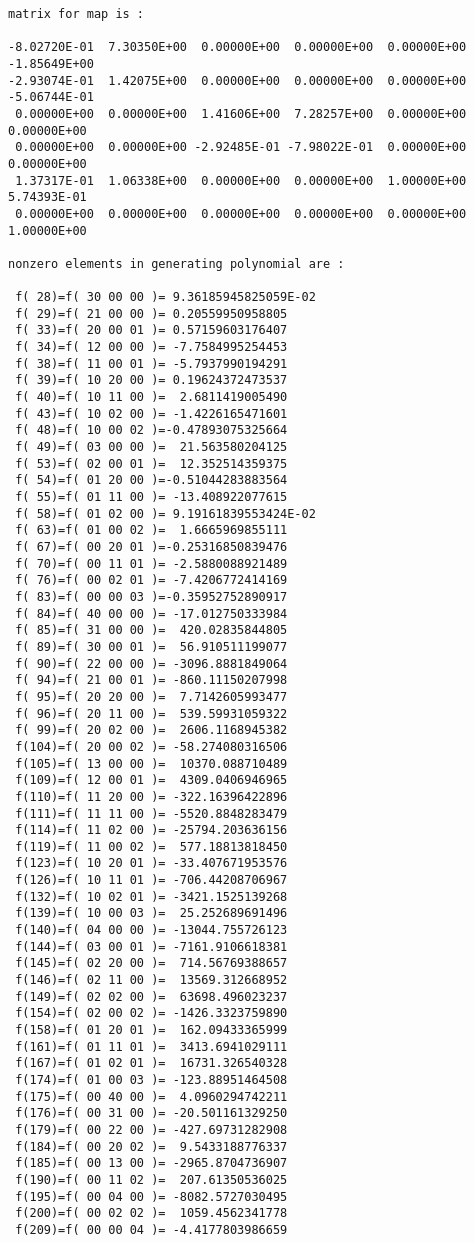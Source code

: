 \begin{footnotesize}
\begin{verbatim}
matrix for map is :

-8.02720E-01  7.30350E+00  0.00000E+00  0.00000E+00  0.00000E+00 -1.85649E+00
-2.93074E-01  1.42075E+00  0.00000E+00  0.00000E+00  0.00000E+00 -5.06744E-01
 0.00000E+00  0.00000E+00  1.41606E+00  7.28257E+00  0.00000E+00  0.00000E+00
 0.00000E+00  0.00000E+00 -2.92485E-01 -7.98022E-01  0.00000E+00  0.00000E+00
 1.37317E-01  1.06338E+00  0.00000E+00  0.00000E+00  1.00000E+00  5.74393E-01
 0.00000E+00  0.00000E+00  0.00000E+00  0.00000E+00  0.00000E+00  1.00000E+00

nonzero elements in generating polynomial are :

 f( 28)=f( 30 00 00 )= 9.36185945825059E-02
 f( 29)=f( 21 00 00 )= 0.20559950958805
 f( 33)=f( 20 00 01 )= 0.57159603176407
 f( 34)=f( 12 00 00 )= -7.7584995254453
 f( 38)=f( 11 00 01 )= -5.7937990194291
 f( 39)=f( 10 20 00 )= 0.19624372473537
 f( 40)=f( 10 11 00 )=  2.6811419005490
 f( 43)=f( 10 02 00 )= -1.4226165471601
 f( 48)=f( 10 00 02 )=-0.47893075325664
 f( 49)=f( 03 00 00 )=  21.563580204125
 f( 53)=f( 02 00 01 )=  12.352514359375
 f( 54)=f( 01 20 00 )=-0.51044283883564
 f( 55)=f( 01 11 00 )= -13.408922077615
 f( 58)=f( 01 02 00 )= 9.19161839553424E-02
 f( 63)=f( 01 00 02 )=  1.6665969855111
 f( 67)=f( 00 20 01 )=-0.25316850839476
 f( 70)=f( 00 11 01 )= -2.5880088921489
 f( 76)=f( 00 02 01 )= -7.4206772414169
 f( 83)=f( 00 00 03 )=-0.35952752890917
 f( 84)=f( 40 00 00 )= -17.012750333984
 f( 85)=f( 31 00 00 )=  420.02835844805
 f( 89)=f( 30 00 01 )=  56.910511199077
 f( 90)=f( 22 00 00 )= -3096.8881849064
 f( 94)=f( 21 00 01 )= -860.11150207998
 f( 95)=f( 20 20 00 )=  7.7142605993477
 f( 96)=f( 20 11 00 )=  539.59931059322
 f( 99)=f( 20 02 00 )=  2606.1168945382
 f(104)=f( 20 00 02 )= -58.274080316506
 f(105)=f( 13 00 00 )=  10370.088710489
 f(109)=f( 12 00 01 )=  4309.0406946965
 f(110)=f( 11 20 00 )= -322.16396422896
 f(111)=f( 11 11 00 )= -5520.8848283479
 f(114)=f( 11 02 00 )= -25794.203636156
 f(119)=f( 11 00 02 )=  577.18813818450
 f(123)=f( 10 20 01 )= -33.407671953576
 f(126)=f( 10 11 01 )= -706.44208706967
 f(132)=f( 10 02 01 )= -3421.1525139268
 f(139)=f( 10 00 03 )=  25.252689691496
 f(140)=f( 04 00 00 )= -13044.755726123
 f(144)=f( 03 00 01 )= -7161.9106618381
 f(145)=f( 02 20 00 )=  714.56769388657
 f(146)=f( 02 11 00 )=  13569.312668952
 f(149)=f( 02 02 00 )=  63698.496023237
 f(154)=f( 02 00 02 )= -1426.3323759890
 f(158)=f( 01 20 01 )=  162.09433365999
 f(161)=f( 01 11 01 )=  3413.6941029111
 f(167)=f( 01 02 01 )=  16731.326540328
 f(174)=f( 01 00 03 )= -123.88951464508
 f(175)=f( 00 40 00 )=  4.0960294742211
 f(176)=f( 00 31 00 )= -20.501161329250
 f(179)=f( 00 22 00 )= -427.69731282908
 f(184)=f( 00 20 02 )=  9.5433188776337
 f(185)=f( 00 13 00 )= -2965.8704736907
 f(190)=f( 00 11 02 )=  207.61350536025
 f(195)=f( 00 04 00 )= -8082.5727030495
 f(200)=f( 00 02 02 )=  1059.4562341778
 f(209)=f( 00 00 04 )= -4.4177803986659


\end{verbatim}
\end{footnotesize}
